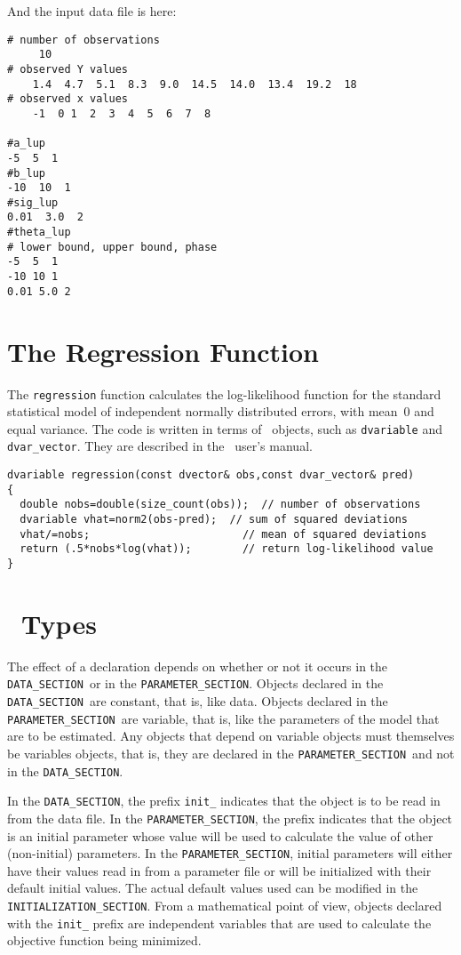 \documentclass{admbmanual}
\newcommand\DS{\texttt{DATA\_SECTION}}
\newcommand\PS{\texttt{PARAMETER\_SECTION}}
\begin{document}
And the input data file is here:

\begin{lstlisting}
# number of observations
     10
# observed Y values
    1.4  4.7  5.1  8.3  9.0  14.5  14.0  13.4  19.2  18
# observed x values
    -1  0 1  2  3  4  5  6  7  8

#a_lup
-5  5  1
#b_lup
-10  10  1
#sig_lup
0.01  3.0  2
#theta_lup
# lower bound, upper bound, phase
-5  5  1
-10 10 1
0.01 5.0 2
\end{lstlisting}


\appendix

\chapter{The Regression Function}\label{ch:appendix-regression-function}

The \texttt{regression} function calculates the log-likelihood function
for the standard statistical model of independent normally distributed errors,
with mean~0 and equal variance. The code is written in terms of \scAD\ objects,
such as \texttt{dvariable} and \texttt{dvar\_vector}. They are described in the
\scAD\ user's manual.
\begin{lstlisting}
dvariable regression(const dvector& obs,const dvar_vector& pred)
{
  double nobs=double(size_count(obs));  // number of observations
  dvariable vhat=norm2(obs-pred);  // sum of squared deviations
  vhat/=nobs;                        // mean of squared deviations
  return (.5*nobs*log(vhat));        // return log-likelihood value
}
\end{lstlisting}

\chapter{\ADM\ Types}

The effect of a declaration depends on whether or not it occurs in the \DS\ or
in the \PS. Objects declared in the \DS\ are constant, that is, like data.
Objects declared in the \PS\ are variable, that is, like the parameters of the
model that are to be estimated. Any objects that depend on variable objects must
themselves be variables objects, that is, they are declared in the \PS\ and not
in the \DS.

In the \DS, the prefix \texttt{init\_} indicates that the object is to be read
in from the data file. In the \PS, the prefix indicates that the object is an
initial parameter whose value will be used to calculate the value of other
(non-initial) parameters. In the \PS, initial parameters will either have their
values read in from a parameter file or will be initialized with their default
initial values. The actual default values used can be modified in the
\texttt{INITIALIZATION\_SECTION}. From a mathematical point of view, objects
declared with the \texttt{init\_} prefix are independent variables that are used
to calculate the objective function being minimized.
\end{document}
